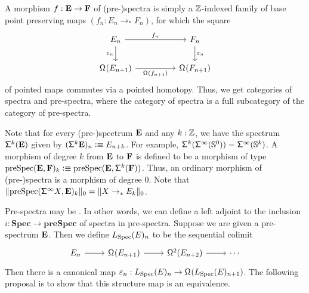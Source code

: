 \documentclass[reqno]{amsart}
\begin{document}
A morphism
$f:\spectrum{E}\to\spectrum{F}$ of (pre-)spectra is simply a $\Z$-indexed family
of base point preserving maps $(f_n:E_n\to_\ast F_n)$, for which the square
\begin{equation*}
\begin{tikzcd}[column sep=huge]
E_n \arrow[d,swap,"\varepsilon_n"] \arrow[r,"f_n"] & F_n \arrow[d,"\varepsilon_n"] \\
\loopspace{E_{n+1}} \arrow[r,swap,"\loopspace{f_{n+1}}"] & \loopspace{F_{n+1}}
\end{tikzcd}
\end{equation*}
of pointed maps commutes via a pointed homotopy.
Thus, we get categories of spectra and pre-spectra, where the category of spectra is a
full subcategory of the category of pre-spectra. 

Note that for every (pre-)spectrum $\spectrum{E}$ and any $k:\Z$, we have the spectrum
$\spshift{k}(\spectrum{E})$ given by $(\spshift{k}{\spectrum{E}})_n\defeq E_{n+k}$. 
For example, $\spshift{k}(\suspspec(\sphere{0}))=\suspspec(\sphere{k})$. 
A morphism of degree $k$ from $\spectrum{E}$ to $\spectrum{F}$ is defined to be
a morphism of type $\mathrm{preSpec}(\spectrum{E},\spectrum{F})_k\defeq \mathrm{preSpec}(\spectrum{E},\spshift{k}(\spectrum{F}))$. Thus, an ordinary morphism of (pre-)spectra is a morphism of degree $0$.
Note that $\trunc{0}{\mathrm{preSpec}(\suspspec{X},\spectrum{E})_k}=\trunc{0}{X\to_\ast E_k}$. 

Pre-spectra may be  \cite{LewisMay}. In other words, we can define a left adjoint
to the inclusion $i:\mathbf{Spec}\to\mathbf{preSpec}$ of spectra in pre-spectra.
Suppose we are given a pre-spectrum $\spectrum{E}$. Then we define
$\spectrify(E)_n$ to be the sequential colimit 
\begin{equation*}
\begin{tikzcd}
E_n \arrow[r] & \loopspace{E_{n+1}} \arrow[r] & \loopspace[2]{E_{n+2}} \arrow[r] & \cdots
\end{tikzcd}
\end{equation*}
Then there is a canonical map $\varepsilon_n:\spectrify(E)_n\to\loopspace{\spectrify(E)_{n+1}}$. The following proposal is to show that this structure map is an equivalence.
\end{document}
